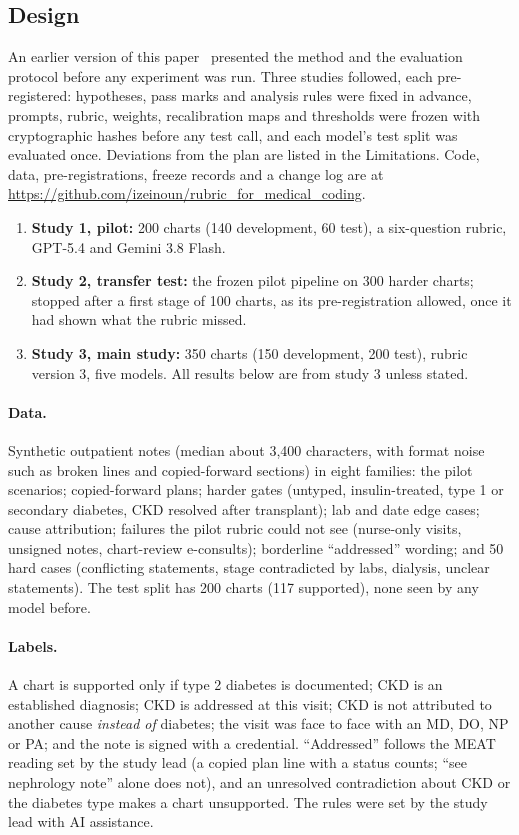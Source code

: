 \documentclass[10pt,letterpaper]{article}
\begin{document}
\subsection{Design}

An earlier version of this paper~\cite{ewc1} presented the method and the evaluation protocol before any experiment was run. Three studies followed, each pre-registered: hypotheses, pass marks and analysis rules were fixed in advance, prompts, rubric, weights, recalibration maps and thresholds were frozen with cryptographic hashes before any test call, and each model's test split was evaluated once. Deviations from the plan are listed in the Limitations. Code, data, pre-registrations, freeze records and a change log are at \url{https://github.com/izeinoun/rubric_for_medical_coding}.
\begin{enumerate}
  \item \textbf{Study 1, pilot:} 200 charts (140 development, 60 test), a six-question rubric, GPT-5.4 and Gemini 3.8 Flash.
  \item \textbf{Study 2, transfer test:} the frozen pilot pipeline on 300 harder charts; stopped after a first stage of 100 charts, as its pre-registration allowed, once it had shown what the rubric missed.
  \item \textbf{Study 3, main study:} 350 charts (150 development, 200 test), rubric version 3, five models. All results below are from study 3 unless stated.
\end{enumerate}

\paragraph{Data.} Synthetic outpatient notes (median about 3,400 characters, with format noise such as broken lines and copied-forward sections) in eight families: the pilot scenarios; copied-forward plans; harder gates (untyped, insulin-treated, type 1 or secondary diabetes, CKD resolved after transplant); lab and date edge cases; cause attribution; failures the pilot rubric could not see (nurse-only visits, unsigned notes, chart-review e-consults); borderline ``addressed'' wording; and 50 hard cases (conflicting statements, stage contradicted by labs, dialysis, unclear statements). The test split has 200 charts (117 supported), none seen by any model before.

\paragraph{Labels.} A chart is supported only if type 2 diabetes is documented; CKD is an established diagnosis; CKD is addressed at this visit; CKD is not attributed to another cause \emph{instead of} diabetes; the visit was face to face with an MD, DO, NP or PA; and the note is signed with a credential. ``Addressed'' follows the MEAT reading set by the study lead (a copied plan line with a status counts; ``see nephrology note'' alone does not), and an unresolved contradiction about CKD or the diabetes type makes a chart unsupported. The rules were set by the study lead with AI assistance.
\end{document}
